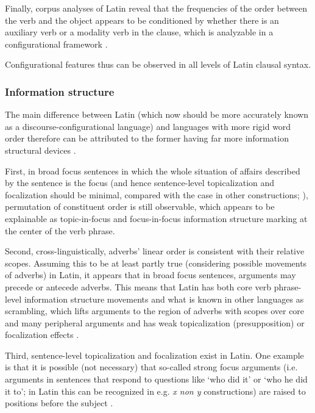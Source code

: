 \documentclass[a4paper, oneside, 12pt]{report}
\newcommand*{\citepage}[1]{p.~{#1}}
\newcommand*{\citepages}[1]{pp.~{#1}}
\newcommand{\form}[1]{\emph{#1}}
\newcommand{\translate}[1]{`#1'}
\begin{document}
Finally, corpus analyses of Latin reveal that the frequencies of the order between the verb and the object appears to be conditioned by whether there is an auxiliary verb or a modality verb in the clause, which is analyzable in a configurational framework \citep[\citepages{293-295}]{danckaert2017development}.

Configurational features thus can be observed in all levels of Latin clausal syntax.

\subsubsection{Information structure}

The main difference between Latin (which now should be more accurately known as a discourse-configurational language) and languages with more rigid word order therefore can be attributed to the former having far more information structural devices \citep[\citepage{15}]{danckaert2017development}.

First, in broad focus sentences in which the whole situation of affairs described by the sentence is the focus
(and hence sentence-level topicalization and focalization should be minimal,
compared with the case in other constructions; \citealt[\citepage{36}]{devine2006latin}),
permutation of constituent order is still observable,
which appears to be explainable as topic-in-focus and focus-in-focus information structure marking at the center of the verb phrase.

Second, cross-linguistically, adverbs' linear order is consistent with their relative scopes.
Assuming this to be at least partly true (considering possible movements of adverbs) in Latin, 
it appears that in broad focus sentences, arguments may precede or antecede adverbs.
This means that Latin has both core verb phrase-level information structure movements \citep[\citepages{36-88}]{devine2006latin}
and what is known in other languages as scrambling,
which lifts arguments to the region of adverbs with scopes over core and many peripheral arguments and has weak topicalization (presupposition) or focalization effects \citep[\citepages{98-112}]{devine2006latin}.

Third, sentence-level topicalization and focalization exist in Latin.
One example is that it is possible (not necessary) that so-called strong focus arguments (i.e. arguments in sentences that respond to questions like \translate{who did it} or \translate{who he did it to}; in Latin this can be recognized in e.g. \form{x non y} constructions) are raised to positions before the subject \citep[\citepages{225-232,302}]{devine2006latin}.
\end{document}
